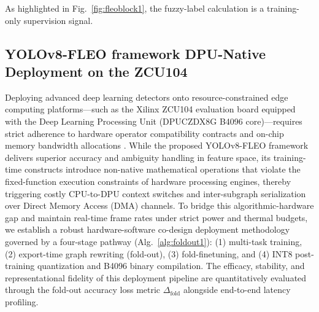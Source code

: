 As highlighted in Fig.~\ref{fig:fleoblock1}, the fuzzy-label calculation is a training-only supervision signal. 
\subsection{YOLOv8-FLEO framework DPU-Native Deployment on the ZCU104}
\label{sec:hard}
Deploying advanced deep learning detectors onto resource-constrained edge computing platforms---such as the Xilinx ZCU104 evaluation board equipped with the Deep Learning Processing Unit (DPUCZDX8G B4096 core)---requires strict adherence to hardware operator compatibility contracts and on-chip memory bandwidth allocations \citep{bib25}. While the proposed YOLOv8-FLEO framework delivers superior accuracy and ambiguity handling in feature space, its training-time constructs introduce non-native mathematical operations that violate the fixed-function execution constraints of hardware processing engines, thereby triggering costly CPU-to-DPU context switches and inter-subgraph serialization over Direct Memory Access (DMA) channels. To bridge this algorithmic-hardware gap and maintain real-time frame rates under strict power and thermal budgets, we establish a robust hardware-software co-design deployment methodology governed by a four-stage pathway (Alg.~\ref{alg:foldout1}): (1) multi-task training, (2) export-time graph rewriting (fold-out), (3) fold-finetuning, and (4) INT8 post-training quantization and B4096 binary compilation. The efficacy, stability, and representational fidelity of this deployment pipeline are quantitatively evaluated through the fold-out accuracy loss metric $\Delta_{\mathrm{fold}}$ alongside end-to-end latency profiling.

